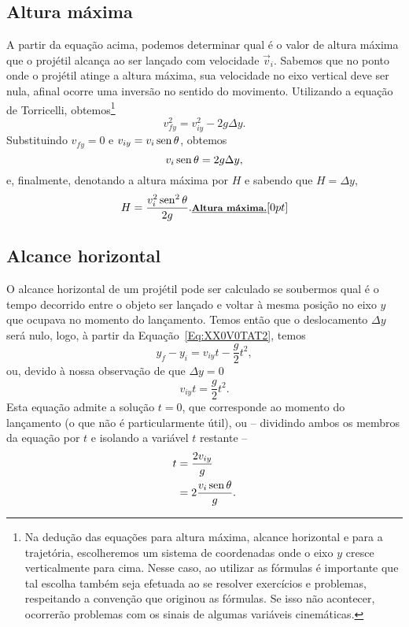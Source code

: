 \subsection{Altura máxima}

A partir da equação acima, podemos determinar qual é o valor de altura máxima que o projétil alcança ao ser lançado com velocidade $\vec{v}_i$. Sabemos que no ponto onde o projétil atinge a altura máxima, sua velocidade no eixo vertical deve ser nula, afinal ocorre uma inversão no sentido do movimento. Utilizando a equação de Torricelli, obtemos\footnote[][-2cm]{Na dedução das equações para altura máxima, alcance horizontal e para a trajetória, escolheremos um sistema de coordenadas onde o eixo $y$ cresce verticalmente para cima. Nesse caso, ao utilizar as fórmulas é importante que tal escolha também seja efetuada ao se resolver exercícios e problemas, respeitando a convenção que originou as fórmulas. Se isso não acontecer, ocorrerão problemas com os sinais de algumas variáveis cinemáticas.}
\begin{equation}
  v_{fy}^2 = v_{iy}^2 - 2 g \Delta y.
\end{equation}
%
Substituindo $v_{fy} = 0$ e $v_{iy} = v_i\operatorname{sen}\theta$, obtemos
\begin{equation}
  v_i\operatorname{sen}\theta = 2g\Delta y,
\end{equation}
%
e, finalmente, denotando a altura máxima por $H$ e sabendo que $H = \Delta y$,
\begin{equation}
  H = \frac{v_i^2\operatorname{sen}^2\theta}{2g}. \relax{\footnotesize\emph{\textbf{Altura máxima.}}}[0pt]
\end{equation}

\subsection{Alcance horizontal}

O alcance horizontal de um projétil pode ser calculado se soubermos qual é o tempo decorrido entre o objeto ser lançado e voltar à mesma posição no eixo $y$ que ocupava no momento do lançamento. Temos então que o deslocamento $\Delta y$ será nulo, logo, à partir da Equação~\eqref{Eq:XX0V0TAT2}, temos
\begin{equation}
  y_f-y_i = v_{iy}t - \frac{g}{2}t^2,
\end{equation}
%
ou, devido à nossa observação de que $\Delta y = 0$
\begin{equation}
  v_{iy}t = \frac{g}{2} t^2.
\end{equation}
%
Esta equação admite a solução $t = 0$, que corresponde ao momento do lançamento (o que não é particularmente útil), ou -- dividindo ambos os membros da equação por $t$ e isolando a variável $t$ restante --
\begin{align}
  t &= \frac{2v_{iy}}{g} \\
  &= 2\frac{v_i\operatorname{sen}\theta}{g}.
\end{align}

